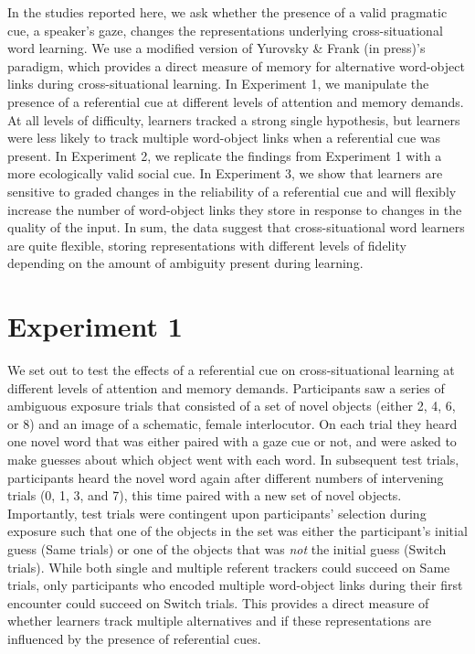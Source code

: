 \documentclass[a4paper,man,natbib]{apa6}
\begin{document}
In the studies reported here, we ask whether the presence of a valid
pragmatic cue, a speaker's gaze, changes the representations underlying
cross-situational word learning. We use a modified version of Yurovsky
\& Frank (in press)'s paradigm, which provides a direct measure of
memory for alternative word-object links during cross-situational
learning. In Experiment 1, we manipulate the presence of a referential
cue at different levels of attention and memory demands. At all levels
of difficulty, learners tracked a strong single hypothesis, but learners
were less likely to track multiple word-object links when a referential
cue was present. In Experiment 2, we replicate the findings from
Experiment 1 with a more ecologically valid social cue. In Experiment 3,
we show that learners are sensitive to graded changes in the reliability
of a referential cue and will flexibly increase the number of
word-object links they store in response to changes in the quality of
the input. In sum, the data suggest that cross-situational word learners
are quite flexible, storing representations with different levels of
fidelity depending on the amount of ambiguity present during learning.

\section{Experiment 1}\label{experiment-1}

We set out to test the effects of a referential cue on cross-situational
learning at different levels of attention and memory demands.
Participants saw a series of ambiguous exposure trials that consisted of
a set of novel objects (either 2, 4, 6, or 8) and an image of a
schematic, female interlocutor. On each trial they heard one novel word
that was either paired with a gaze cue or not, and were asked to make
guesses about which object went with each word. In subsequent test
trials, participants heard the novel word again after different numbers
of intervening trials (0, 1, 3, and 7), this time paired with a new set
of novel objects. Importantly, test trials were contingent upon
participants' selection during exposure such that one of the objects in
the set was either the participant's initial guess (Same trials) or one
of the objects that was \emph{not} the initial guess (Switch trials).
While both single and multiple referent trackers could succeed on Same
trials, only participants who encoded multiple word-object links during
their first encounter could succeed on Switch trials. This provides a
direct measure of whether learners track multiple alternatives and if
these representations are influenced by the presence of referential
cues.
\end{document}
